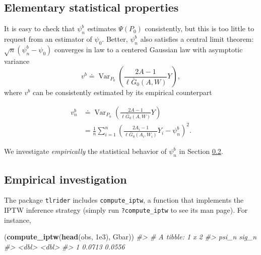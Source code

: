 \documentclass[11pt,openright,twoside]{book}
\newenvironment{Shaded}{\begin{snugshade}}{\end{snugshade}}
\newcommand{\CommentTok}[1]{\textcolor[rgb]{0.56,0.35,0.01}{\textit{#1}}}
\newcommand{\FloatTok}[1]{\textcolor[rgb]{0.00,0.00,0.81}{#1}}
\newcommand{\KeywordTok}[1]{\textcolor[rgb]{0.13,0.29,0.53}{\textbf{#1}}}
\newcommand{\NormalTok}[1]{#1}
\DeclareMathOperator{\Var}{Var}
\newcommand{\defq}{\doteq}
\newcommand{\Gbar}{\bar{G}}
\theoremstyle{definition}
\theoremstyle{definition}
\theoremstyle{definition}
\theoremstyle{remark}
\begin{document}
\hypertarget{elementary-statistical-properties}{%
\subsection{Elementary statistical properties}\label{elementary-statistical-properties}}

It is easy to check that \(\psi_{n}^{b}\) estimates \(\Psi(P_{0})\) consistently,
but this is too little to request from an estimator of \(\psi_{0}\). Better,
\(\psi_{n}^{b}\) also satisfies a central limit theorem: \(\sqrt{n} (\psi_{n}^{b} - \psi_{0})\) converges in law to a centered Gaussian law with
asymptotic variance \begin{equation*}v^{b}     \defq     \Var_{P_{0}}
\left(\frac{2A-1}{\ell\Gbar_{0}(A,W)}Y\right),\end{equation*} where \(v^{b}\)
can be consistently estimated by its empirical counterpart

\begin{align}
\label{eq:v-n-b}      v_{n}^{b}       &\defq      \Var_{P_{n}}
\left(\frac{2A-1}{\ell\Gbar_{0}(A,W)}Y\right) \\ 
&=        \frac{1}{n}        \sum_{i=1}^{n}\left(\frac{2A_{i}-1}{\ell\Gbar_{0}
(A_{i},W_{i})} Y_{i} - \psi_{n}^{b}\right)^{2}.
\end{align}

We investigate \emph{empirically} the statistical behavior of \(\psi_{n}^{b}\) in
Section \ref{empirical-inves-IPTW}.

\hypertarget{empirical-inves-IPTW}{%
\subsection{Empirical investigation}\label{empirical-inves-IPTW}}

The package \texttt{tlrider} includes \texttt{compute\_iptw}, a function that implements the
IPTW inference strategy (simply run \texttt{?compute\_iptw} to see its man page). For
instance,

\begin{Shaded}
\begin{Highlighting}[]
\NormalTok{(}\KeywordTok{compute_iptw}\NormalTok{(}\KeywordTok{head}\NormalTok{(obs, }\FloatTok{1e3}\NormalTok{), Gbar))}
\CommentTok{#> # A tibble: 1 x 2}
\CommentTok{#>    psi_n  sig_n}
\CommentTok{#>    <dbl>  <dbl>}
\CommentTok{#> 1 0.0713 0.0556}
\end{Highlighting}
\end{Shaded}
\end{document}
